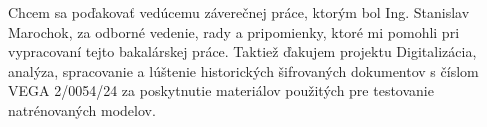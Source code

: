 Chcem sa poďakovať vedúcemu záverečnej práce, ktorým bol Ing. Stanislav Marochok, za odborné vedenie, rady a pripomienky, ktoré mi pomohli pri vypracovaní tejto bakalárskej práce. Taktiež ďakujem projektu Digitalizácia, analýza, spracovanie a lúštenie historických šifrovaných dokumentov s číslom VEGA 2/0054/24 za poskytnutie materiálov použitých pre testovanie natrénovaných modelov.